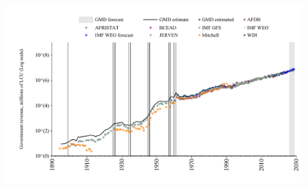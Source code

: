 \documentclass[12pt,a4paper,landscape]{article}
\begin{document}
\begin{adjustbox}{max totalsize={\paperwidth}{\paperheight},center}
\begin{minipage}[t][\textheight][t]{\textwidth}
\begin{table}[H]
\end{table}
\begin{figure}[H]
\centering
\includegraphics[width=\textwidth,height=0.6\textheight,keepaspectratio]{graphs/SEN_govrev.pdf}
\end{figure}
\end{minipage}
\end{adjustbox}
\end{document}

